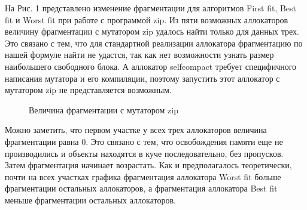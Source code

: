 \documentclass[12pt,a4paper]{article}
\begin{document}
   На Рис. 1 представлено изменение фрагментации для алгоритмов First fit, Best fit и Worst fit при работе с программой zip. Из пяти возможных аллокаторов
   величину фрагментации с мутатором zip удалось найти только для данных трех. Это связано с тем, что для стандартной реализации аллокатора фрагментацию по нашей
   формуле найти не удастся, так как нет возможности узнать размер наибольшего свободного блока. А аллокатор selfcompact требует специфичного написания мутатора и 
   его компиляции, поэтому запустить этот аллокатор с мутатором zip не представляется возможным.
   
   \begin{figure}[h]
   \caption{Величина фрагментации с мутатором zip}
   \label{ris:image}
   \end{figure}
   
   Можно заметить, что первом участке у всех трех аллокаторов величина фрагментации равна 0. Это связано с тем, что освобождения памяти еще не производились и объекты
   находятся в куче последовательно, без пропусков. Затем фрагментация начинает возрастать. Как и предполагалось теоретически, почти на всех участках графика 
   фрагментация аллокатора Worst fit больше фрагментации остальных аллокаторов, а фрагментация аллокатора Best fit меньше фрагментации остальных аллокаторов.
   
\end{document}
